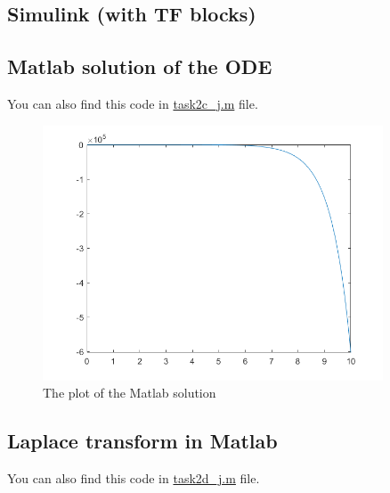 \documentclass{article}
\begin{document}
    \subsection{Simulink (with TF blocks)}
    
    \subsection{Matlab solution of the ODE}
    You can also find this code in \href{run:task2c\_j.m}{task2c\_j.m} file.
    
    \begin{figure}[h]
        \centering
        \includegraphics[width=0.9\textwidth]{images/solution2c_j.png}
        \caption{The plot of the Matlab solution}
        \label{fig:plot1c}
    \end{figure}
    
    \subsection{Laplace transform in Matlab}
    You can also find this code in \href{run:task2d\_j.m}{task2d\_j.m} file.
    
 
\end{document}
